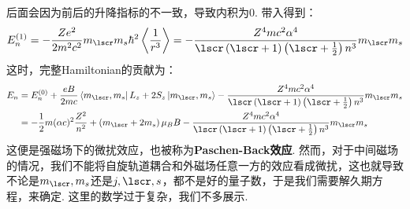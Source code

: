后面会因为前后的升降指标的不一致，导致内积为0. 带入得到：
\[
E_{n}^{(1)} = -\frac{Ze^{2}}{2m^{2}c^{2}}m_{\lscr}m_{s}\hh^{2}\avg{\frac{1}{r^{3}}} = -\frac{Z^{4}mc^{2}\al^{4}}{\lscr\br{\lscr+1}\br{\lscr+\frac{1}{2}}n^{3}}m_{\lscr}m_{s}
\]
这时，完整Hamiltonian的贡献为：
\begin{align*}
E_{n}
& = E_{n}^{(0)} + \frac{eB}{2mc}\bra{m_{\lscr},m_{s}}L_{z} + 2S_{z}\ket{m_{\lscr},m_{s}} - \frac{Z^{4}mc^{2}\al^{4}}{\lscr\br{\lscr+1}\br{\lscr+\frac{1}{2}}n^{3}}m_{\lscr}m_{s} \\
& = -\frac{1}{2}m(\al c)^{2}\frac{Z^{2}}{n^{2}} + \br{m_{\lscr}+2m_{s}}\mu_{B}B - \frac{Z^{4}mc^{2}\al^{4}}{\lscr\br{\lscr+1}\br{\lscr+\frac{1}{2}}n^{3}}m_{\lscr}m_{s} 
\end{align*}
这便是强磁场下的微扰效应，也被称为\textbf{Paschen-Back效应}. 然而，对于中间磁场的情况，我们不能将自旋轨道耦合和外磁场任意一方的效应看成微扰，这也就导致不论是\(m_{\lscr},m_{s}\)还是\(j,\lscr,s\)，都不是好的量子数，于是我们需要解久期方程，来确定. 这里的数学过于复杂，我们不多展示. 
